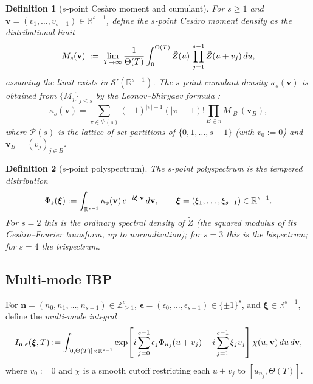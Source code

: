 \documentclass{amsart}
\newcommand{\assign}{:=}
\newcommand{\tmem}[1]{{\em #1\/}}
\newcommand{\tmmathbf}[1]{\ensuremath{\boldsymbol{#1}}}
\newtheorem{definition}{Definition}
\newcommand{\abs}[1]{\left| #1 \right|}
\newcommand{\Zt}{\tilde{Z}}
\begin{document}
\begin{definition}
  [$s$-point Ces{\`a}ro moment and cumulant]\label{def:cumulant} For $s \ge 1$
  and $\mathbf{v} = (v_1, \ldots, v_{s - 1}) \in \mathbb{R}^{s - 1}$, define
  the $s$-point Ces{\`a}ro moment density as the distributional limit
  \[ M_s (\mathbf{v}) \hspace{0.27em} \assign \hspace{0.27em} \lim_{T \to
     \infty}  \frac{1}{\Theta (T)}  \int_0^{\Theta (T)} \Zt (u) 
     \hspace{0.17em} \prod_{j = 1}^{s - 1} \Zt (u + v_j)  \hspace{0.17em} du,
  \]
  assuming the limit exists in $\mathcal{S}' (\mathbb{R}^{s - 1})$. The
  $s$-point cumulant density $\kappa_s (\mathbf{v})$ is obtained from $\{M_j
  \}_{j \le s}$ by the Leonov--Shiryaev formula
  {\cite{LeonovShiryaev1959,Brillinger1965}}:
  \[ \kappa_s (\mathbf{v}) = \sum_{\pi \in \mathcal{P} (s)} (- 1)^{\abs{\pi} -
     1}  (\abs{\pi} - 1) ! \prod_{B \in \pi} M_{\abs{B}} (\mathbf{v}_B), \]
  where $\mathcal{P} (s)$ is the lattice of set partitions of $\{0, 1, \ldots,
  s - 1\}$ (with $v_0 \assign 0$) and $\mathbf{v}_B = (v_j)_{j \in B}$.
\end{definition}

\begin{definition}
  [$s$-point polyspectrum]\label{def:polyspec} The $s$-point polyspectrum is
  the tempered distribution
  \[ \Phi_s (\tmmathbf{\xi}) \assign \int_{\mathbb{R}^{s - 1}} \kappa_s
     (\mathbf{v})  \hspace{0.17em} e^{- i\tmmathbf{\xi} \cdot \mathbf{v}} 
     \hspace{0.17em} d \mathbf{v}, \qquad \tmmathbf{\xi}= (\xi_1, \ldots,
     \xi_{s - 1}) \in \mathbb{R}^{s - 1} . \]
  For $s = 2$ this is the ordinary spectral density of $\Zt$ (the squared
  modulus of its Ces{\`a}ro--Fourier transform, up to normalization); for $s =
  3$ this is the bispectrum; for $s = 4$ the trispectrum.
\end{definition}

\subsection{Multi-mode IBP}

For $\mathbf{n} = (n_0, n_1, \ldots, n_{s - 1}) \in \mathbb{Z}_{\ge 1}^s$,
$\tmmathbf{\epsilon}= (\epsilon_0, \ldots, \epsilon_{s - 1}) \in \{\pm 1\}^s$,
and $\tmmathbf{\xi} \in \mathbb{R}^{s - 1}$, define the {\tmem{multi-mode
integral}}
\begin{equation}
  \label{eq:multi-I} I_{\mathbf{n}, \tmmathbf{\epsilon}} (\tmmathbf{\xi}, T)
  \assign \int_{[0, \Theta (T)] \times \mathbb{R}^{s - 1}} \exp
  \hspace{-0.17em} \left[ i \sum_{j = 0}^{s - 1} \epsilon_j \Phi_{n_j} (u +
  v_j) - i \sum_{j = 1}^{s - 1} \xi_j v_j \right] \chi (u, \mathbf{v}) 
  \hspace{0.17em} du \hspace{0.17em} d \mathbf{v},
\end{equation}
where $v_0 \assign 0$ and $\chi$ is a smooth cutoff restricting each $u + v_j$
to $[u_{n_j}, \Theta (T)]$.
\end{document}
